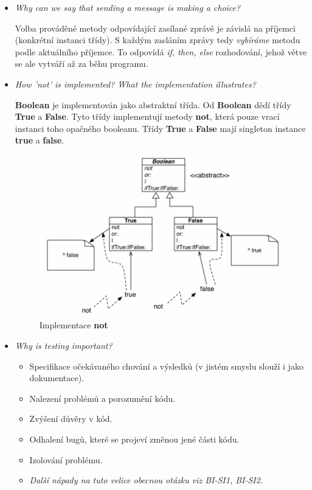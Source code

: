 \documentclass{szzclass}
\begin{document}
\begin{itemize}
      \item \textit{Why can we say that sending a message is making a choice?}
      
      Volba prováděné metody odpovídající zasílané zprávě je závislá na příjemci (konkrétní instanci třídy).
      S každým zasláním zprávy tedy \textit{vybíráme} metodu podle aktuálního příjemce.
      To odpovídá \textit{if, then, else} rozhodování, jehož větve se ale vytváří až za běhu programu.

      \item \textit{How 'not' is implemented? What the implementation illustrates?}
      
      \textbf{Boolean} je implementován jako abstraktní třída. Od \textbf{Boolean} dědí třídy \textbf{True}
      a \textbf{False}. Tyto třídy implementují metody \textbf{not}, která pouze vrací instanci toho opačného booleanu.
      Třídy \textbf{True} a \textbf{False} mají singleton instance \textbf{true} a \textbf{false}.

      \begin{figure}[h]
            \centering
            \includegraphics[width=1\textwidth]{topics/bi-wsi-si-09/not.png}
            \caption{Implementace \textbf{not}}
      \end{figure}

      \item \textit{Why is testing important?}
      
      \begin{itemize}
            \item Specifikace očekávaného chování a výsledků (v jistém smyslu slouží i jako dokumentace).
            \item Nalezení problémů a porozumění kódu.
            \item Zvýšení důvěry v kód.
            \item Odhalení bugů, které se projeví změnou jené části kódu.
            \item Izolování problému.
            \item \textit{Další nápady na tuto velice obecnou otázku viz BI-SI1, BI-SI2.}
      \end{itemize}


\end{itemize}
\end{document}
